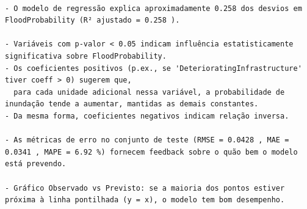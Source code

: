 \documentclass[
  letterpaper,
  DIV=11,
  numbers=noendperiod]{scrartcl}
\begin{document}
\begin{verbatim}

- O modelo de regressão explica aproximadamente 0.258 dos desvios em FloodProbability (R² ajustado = 0.258 ).

- Variáveis com p-valor < 0.05 indicam influência estatisticamente significativa sobre FloodProbability.
- Os coeficientes positivos (p.ex., se 'DeterioratingInfrastructure' tiver coeff > 0) sugerem que,
  para cada unidade adicional nessa variável, a probabilidade de inundação tende a aumentar, mantidas as demais constantes.
- Da mesma forma, coeficientes negativos indicam relação inversa.

- As métricas de erro no conjunto de teste (RMSE = 0.0428 , MAE = 0.0341 , MAPE = 6.92 %) fornecem feedback sobre o quão bem o modelo está prevendo.

- Gráfico Observado vs Previsto: se a maioria dos pontos estiver próxima à linha pontilhada (y = x), o modelo tem bom desempenho.
\end{verbatim}
\end{document}
